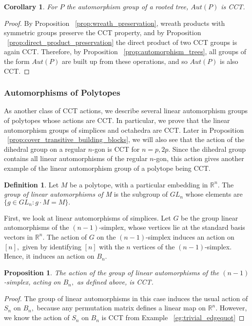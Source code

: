 \documentclass[10 pt]{amsart}
\theoremstyle{plain}
\newtheorem{prop}[thm]{Proposition}
\newtheorem{cor}[thm]{Corollary}
\theoremstyle{definition}
\newtheorem{defn}[thm]{Definition}
\theoremstyle{remark}
\numberwithin{equation}{section}
\newcommand\sssec{\subsubsection}
\newcommand\BR{{\mathbb R}}
\begin{document}
\begin{cor}
\label{cor:tree_cct}
For $P$ the automorphism group of a rooted tree, $Aut(P)$ is CCT.
\end{cor}
\begin{proof}
By Proposition ~\ref{prop:wreath_preservation}, wreath products with symmetric groups preserve the CCT property, and by Proposition ~\ref{prop:direct_product_preservation} the direct product of two CCT groups is again CCT. Therefore, by Proposition ~\ref{prop:automorphism_trees}, all groups of the form $Aut(P)$ are built up from these operations, and so $Aut(P)$ is also CCT.
\end{proof}

\sssec{Automorphisms of Polytopes}
\label{sssec:polytopes}

As another class of CCT actions, we describe several linear automorphism groups of polytopes whose actions are CCT. In particular, we prove that the linear automorphism groups of simplices and octahedra are CCT.
Later in Proposition ~\ref{prop:cover_transitive_building_blocks}, we will also see that the action of the dihedral group on a regular $n$-gon is CCT for $n = p,2p$.  Since the dihedral group contains all linear automorphisms of the regular $n$-gon, this action gives another example of the linear automorphism group of a polytope being CCT.

\begin{defn}
Let $M$ be a polytope, with a particular embedding in $\BR^n.$ The {\it group of linear automorphisms of M} is the subgroup of $GL_n$ whose elements are $\{g \in GL_n:g \cdot M = M\}.$
\end{defn}

First, we look at linear automorphisms of simplices. Let $G$ be the group linear automorphisms of the $(n-1)$-simplex, whose vertices lie at the standard basis vectors in $\BR^n.$ The action of $G$ on the $(n-1)$-simplex induces an action on $[n],$ given by identifying $[n]$ with the $n$ vertices of the $(n-1)$-simplex. Hence, it induces an action on $B_n.$

\begin{prop}
The action of the group of linear automorphisms of the $(n-1)$-simplex, acting on $B_n,$ as defined above, is CCT.
\end{prop}
\begin{proof}
The group of linear automorphisms in this case induces the usual action of $S_n$ on $B_n,$ because any permutation matrix defines a linear map on $\BR^n.$ However, we know the action of $S_n$ on $B_n$ is CCT from Example ~\ref{eg:trivial_edgequot}
\end{proof}
\end{document}
